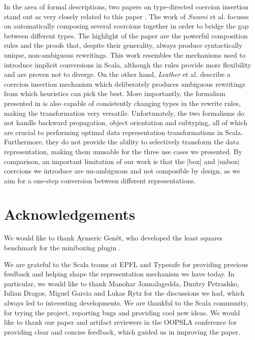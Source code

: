 In the area of formal descriptions, two papers on type-directed coercion insertion stand out as very closely related to this paper \cite{swamy-typed-coercions, leather-type-changing-rewriting}. The work of {\em Swami} et al. \cite{swamy-typed-coercions} focuses on automatically composing several coercions together in order to bridge the gap between different types. The highlight of the paper are the powerful composition rules and the proofs that, despite their generality, always produce syntactically unique, non-ambiguous rewritings. This work resembles the mechanisms used to introduce implicit conversions in Scala, although the rules provide more flexibility and are proven not to diverge. On the other hand, {\em Leather} et al. \cite{leather-type-changing-rewriting} describe a coercion insertion mechanism which deliberately produces ambiguous rewritings from which heuristics can pick the best. More importantly, the formalism presented in \cite{leather-type-changing-rewriting} is also capable of consistently changing types in the rewrite rules, making the transformation very versatile. Unfortunately, the two formalisms do not handle backward propagation, object orientation and subtyping, all of which are crucial to performing optimal data representation transformations in Scala. Furthermore, they do not provide the ability to selectively transform the data representation, making them unusable for the three use cases we presented. By comparison, an important limitation of our work is that the |box| and |unbox| coercions we introduce are un-ambiguous and not composible by design, as we aim for a one-step conversion between different representations.

\section{Acknowledgements}

We would like to thank Aymeric Gen\^et, who developed the least squares benchmark for the miniboxing plugin \cite{miniboxing-linkedlist}.

We are grateful to the Scala teams at EPFL and Typesafe for providing precious feedback and helping shape the representation mechanism we have today. In particular, we would like to thank Manohar Jonnalagedda, Dmitry Petrashko, Iulian Dragos, Miguel Garcia and Lukas Rytz for the discussions we had, which always led to interesting developments. We are thankful to the Scala community, for trying the project, reporting bugs and providing cool new ideas. We would like to thank our paper and artifact reviewers in the OOPSLA conference for providing clear and concise feedback, which guided us in improving the paper.

